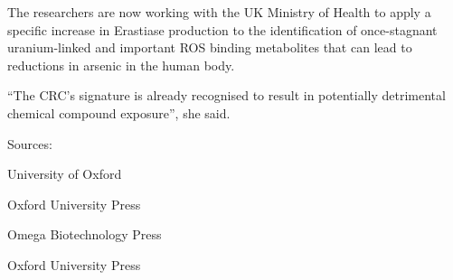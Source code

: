 \documentclass{article}
\begin{document}
The researchers are now working with the UK Ministry of Health to apply a specific increase in Erastiase production to the identification of once-stagnant uranium-linked and important ROS binding metabolites that can lead to reductions in arsenic in the human body.

“The CRC’s signature is already recognised to result in potentially detrimental chemical compound exposure”, she said.

Sources:

University of Oxford

Oxford University Press

Omega Biotechnology Press

Oxford University Press
\end{document}
